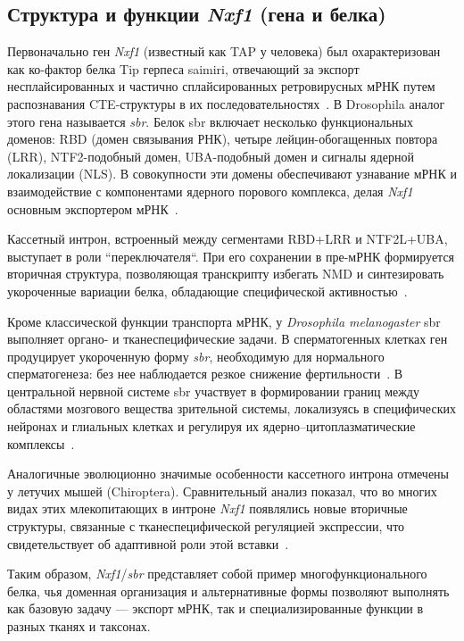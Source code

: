 \subsection{Структура и функции \textit{Nxf1} (гена и белка)}

Первоначально ген \textit{Nxf1} (известный как TAP у человека) был охарактеризован как ко-фактор белка Tip герпеса saimiri, отвечающий за экспорт несплайсированных и частично сплайсированных ретровирусных мРНК путем распознавания CTE-структуры в их последовательностях~\cite{Zolotukhin2001}.
В Drosophila аналог этого гена называется \textit{sbr}.
Белок sbr включает несколько функциональных доменов: RBD (домен связывания РНК), четыре лейцин-обогащенных повтора (LRR), NTF2-подобный домен, UBA-подобный домен и сигналы ядерной локализации (NLS).
В совокупности эти домены обеспечивают узнавание мРНК и взаимодействие с компонентами ядерного порового комплекса, делая \textit{Nxf1} основным экспортером мРНК~\cite{Herold2000,Mamon2013}.

Кассетный интрон, встроенный между сегментами RBD+LRR и NTF2L+UBA, выступает в роли ``переключателя``.
При его сохранении в пре-мРНК формируется вторичная структура, позволяющая транскрипту избегать NMD и синтезировать укороченные вариации белка, обладающие специфической активностью~\cite{Mamon2013,Herold2000}.

Кроме классической функции транспорта мРНК, у \textit{Drosophila melanogaster} sbr выполняет органо- и тканеспецифические задачи.
В сперматогенных клетках ген продуцирует укороченную форму \textit{sbr}, необходимую для нормального сперматогенеза: без нее наблюдается резкое снижение фертильности~\cite{Ginanova2016}.
В центральной нервной системе sbr участвует в формировании границ между областями мозгового вещества зрительной системы, локализуясь в специфических нейронах и глиальных клетках и регулируя их ядерно–цитоплазматические комплексы~\cite{Mamon2021}.

Аналогичные эволюционно значимые особенности кассетного интрона отмечены у летучих мышей (Chiroptera).
Сравнительный анализ показал, что во многих видах этих млекопитающих в интроне \textit{Nxf1} появлялись новые вторичные структуры, связанные с тканеспецифической регуляцией экспрессии, что свидетельствует об адаптивной роли этой вставки~\cite{Bondaruk2022}.

Таким образом, \textit{Nxf1}/\textit{sbr} представляет собой пример многофункционального белка, чья доменная организация и альтернативные формы позволяют выполнять как базовую задачу — экспорт мРНК, так и специализированные функции в разных тканях и таксонах.
